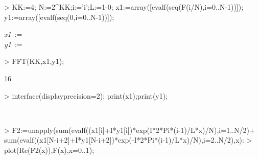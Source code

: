 \begin{MapleInput}
> KK:=4;
  N:=2^KK;i:='i';L:=1-0;
  x1:=array([evalf(seq(F(i/N),i=0..N-1))]);
  y1:=array([evalf(seq(0,i=0..N-1))]);
\end{MapleInput}
\begin{MapleOutputGather}
{\it x1}\, := \,  \notag \\
 {\it y1}\, := \,  \notag
\end{MapleOutputGather}
\begin{MapleInput}
> FFT(KK,x1,y1);
\end{MapleInput}
\begin{MapleOutput}
16
\end{MapleOutput}

\begin{MapleInput}                                      
> interface(displayprecision=2):
  print(x1);print(y1);
\end{MapleInput}
\begin{MapleOutputGather}
 \notag \\
 \notag
\end{MapleOutputGather}

\begin{MapleInput}
> F2:=unapply(sum(evalf((x1[i]+I*y1[i])*exp(I*2*Pi*(i-1)/L*x)/N),i=1..N/2)+
         sum(evalf((x1[N-i+2]+I*y1[N-i+2])*exp(-I*2*Pi*(i-1)/L*x)/N),i=2..N/2),x):
> plot({Re(F2(x)),F(x)},x=0..1);
\end{MapleInput}

